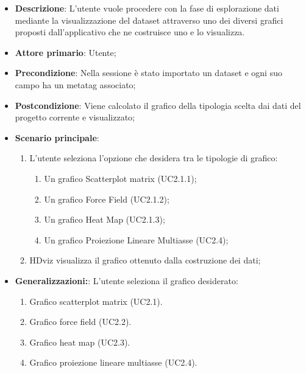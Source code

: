 \begin{itemize}
    \item \textbf{Descrizione}: L’utente vuole procedere con la fase di esplorazione
                                dati mediante la visualizzazione del dataset
                                attraverso uno dei diversi grafici proposti dall’applicativo
                                che ne costruisce uno e lo visualizza.
	
    \item \textbf{Attore primario}: Utente;
    
    \item \textbf{Precondizione}:   Nella sessione è stato importato un dataset e ogni 
                                    suo campo ha un metatag associato;

    \item \textbf{Postcondizione}:  Viene calcolato il grafico della tipologia scelta dai dati 
                                    del progetto corrente e visualizzato;

	\item \textbf{Scenario principale}:
		\begin{enumerate}
			\item L'utente seleziona l'opzione che desidera tra le tipologie di grafico:
			\begin{enumerate}
				\item Un grafico Scatterplot matrix (UC2.1.1);
				\item Un grafico Force Field (UC2.1.2);
				\item Un grafico Heat Map (UC2.1.3);
				\item Un grafico Proiezione Lineare Multiasse (UC2.4);
			\end{enumerate}
			\item HDviz visualizza il grafico ottenuto dalla costruzione dei dati;
        \end{enumerate}
    \item \textbf{Generalizzazioni:}:  L'utente seleziona il grafico desiderato:

    \begin{enumerate}
        
        \item Grafico scatterplot matrix (UC2.1).
        \item Grafico force field (UC2.2).
        \item Grafico heat map (UC2.3).
        \item Grafico proiezione lineare multiasse (UC2.4).
        
    \end{enumerate}

\end{itemize}


